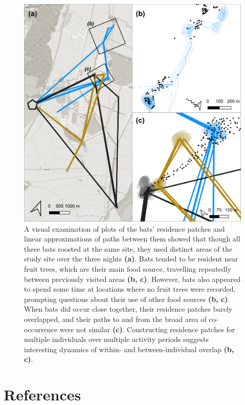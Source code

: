 \documentclass[]{scrartcl}
\begin{document}
\begin{figure}
\centering
\includegraphics{figures/fig_08_bats.png}
\caption{A visual examination of plots of the bats' residence patches and linear approximations of paths between them showed that though all three bats roosted at the same site, they used distinct areas of the study site over the three nights \textbf{(a)}.
Bats tended to be resident near fruit trees, which are their main food source, travelling repeatedly between previously visited areas \textbf{(b, c)}.
However, bats also appeared to spend some time at locations where no fruit trees were recorded, prompting questions about their use of other food sources \textbf{(b, c)}.
When bats did occur close together, their residence patches barely overlapped, and their paths to and from the broad area of co-occurrence were not similar \textbf{(c)}.
Constructing residence patches for multiple individuals over multiple activity periods suggests interesting dynamics of within- and between-individual overlap \textbf{(b, c)}.}
\end{figure}

\hypertarget{references}{%
\section{References}\label{references}}
\end{document}
